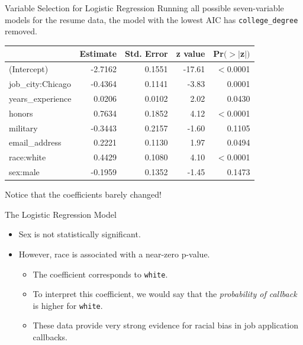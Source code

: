 \begin{frame}{Variable Selection for Logistic Regression}
    Running all possible seven-variable models for the resume data, the model with the lowest AIC has \texttt{college\_degree} removed.
    \begin{table}[h]
        \centering
        \begin{tabular}{l rrrr}
            \hline
                    & Estimate & Std. Error & z value & Pr$(>|$z$|)$ \\
            \hline
(Intercept)         & -2.7162 & 0.1551 & -17.61 & $<$0.0001 \\
job\_city:Chicago   & -0.4364 & 0.1141 & -3.83 & 0.0001 \\
years\_experience   & 0.0206 & 0.0102 & 2.02 & 0.0430 \\
honors              & 0.7634 & 0.1852 & 4.12 & $<$0.0001 \\
military            & -0.3443 & 0.2157 & -1.60 & 0.1105 \\
email\_address      & 0.2221 & 0.1130 & 1.97 & 0.0494 \\
race:white          & 0.4429 & 0.1080 & 4.10 & $<$0.0001 \\
sex:male            & -0.1959 & 0.1352 & -1.45 & 0.1473 \\
            \hline
        \end{tabular}
    \end{table}
    Notice that the coefficients barely changed!
\end{frame}

\begin{frame}{The Logistic Regression Model}
    \begin{itemize}
        \item Sex is not statistically significant.
        \item However, race is associated with a near-zero p-value.
        \begin{itemize}
            \item The coefficient corresponds to \texttt{white}.
            \item To interpret this coefficient, we would say that the \textit{probability of callback} is higher for \texttt{white}.
            \item These data provide very strong evidence for racial bias in job application callbacks.
        \end{itemize}
    \end{itemize}
\end{frame}

